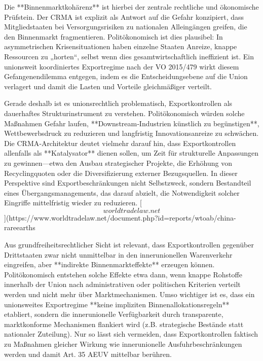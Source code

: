 \documentclass[12pt,a4paper,oneside]{book} %
\begin{document}
Die **Binnenmarktkohärenz** ist hierbei der zentrale rechtliche und ökonomische Prüfstein. Der CRMA ist explizit als Antwort auf die Gefahr konzipiert, dass Mitgliedstaaten bei Versorgungsrisiken zu nationalen Alleingängen greifen, die den Binnenmarkt fragmentieren.  Politökonomisch ist dies plausibel: In asymmetrischen Krisensituationen haben einzelne Staaten Anreize, knappe Ressourcen zu „horten“, selbst wenn dies gesamtwirtschaftlich ineffizient ist. Ein unionsweit koordiniertes Exportregime nach der VO 2015/479 wirkt diesem Gefangenendilemma entgegen, indem es die Entscheidungsebene auf die Union verlagert und damit die Lasten und Vorteile gleichmäßiger verteilt. 

Gerade deshalb ist es unionsrechtlich problematisch, Exportkontrollen als dauerhaftes Strukturinstrument zu verstehen. Politökonomisch würden solche Maßnahmen Gefahr laufen, **Downstream‑Industrien künstlich zu begünstigen**, Wettbewerbsdruck zu reduzieren und langfristig Innovationsanreize zu schwächen.  Die CRMA‑Architektur deutet vielmehr darauf hin, dass Exportkontrollen allenfalls als **Katalysator** dienen sollen, um Zeit für strukturelle Anpassungen zu gewinnen—etwa den Ausbau strategischer Projekte, die Erhöhung von Recyclingquoten oder die Diversifizierung externer Bezugsquellen.  In dieser Perspektive sind Exportbeschränkungen nicht Selbstzweck, sondern Bestandteil eines Übergangsmanagements, das darauf abzielt, die Notwendigkeit solcher Eingriffe mittelfristig wieder zu reduzieren. [\[worldtradelaw.net\]](https://www.worldtradelaw.net/document.php?id=reports/wtoab/china-rareearths%

Aus grundfreiheitsrechtlicher Sicht ist relevant, dass Exportkontrollen gegenüber Drittstaaten zwar nicht unmittelbar in den innerunionellen Warenverkehr eingreifen, aber **indirekte Binnenmarkteffekte** erzeugen können. Politökonomisch entstehen solche Effekte etwa dann, wenn knappe Rohstoffe innerhalb der Union nach administrativen oder politischen Kriterien verteilt werden und nicht mehr über Marktmechanismen.  Umso wichtiger ist es, dass ein unionsweites Exportregime **keine impliziten Binnenallokationsregeln** etabliert, sondern die innerunionelle Verfügbarkeit durch transparente, marktkonforme Mechanismen flankiert wird (z.B. strategische Bestände statt nationaler Zuteilung).  Nur so lässt sich vermeiden, dass Exportkontrollen faktisch zu Maßnahmen gleicher Wirkung wie innerunionelle Ausfuhrbeschränkungen werden und damit Art. 35 AEUV mittelbar berühren. 
\end{document}
